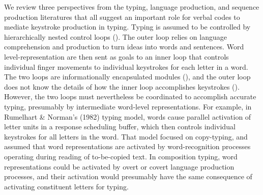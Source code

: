 \documentclass[floatsintext,man]{apa6}
\theoremstyle{definition}
\theoremstyle{definition}
\theoremstyle{definition}
\theoremstyle{remark}
\begin{document}
We review three perspectives from the typing, language production, and
sequence production literatures that all suggest an important role for
verbal codes to mediate keystroke production in typing. Typing is
assumed to be controlled by hierarchically nested control loops (). The
outer loop relies on language comprehension and production to turn ideas
into words and sentences. Word level-representation are then sent as
goals to an inner loop that controls individual finger movements to
individual keystrokes for each letter in a word. The two loops are
informationally encapsulated modules (), and the outer loop does not
know the details of how the inner loop accomplishes keystrokes ().
However, the two loops must nevertheless be coordinated to accomplish
accurate typing, presumably by intermediate word-level representations.
For example, in Rumelhart \& Norman's (1982) typing model, words cause
parallel activation of letter units in a response scheduling buffer,
which then controls individual keystrokes for all letters in the word.
That model focused on copy-typing, and assumed that word representations
are activated by word-recognition processes operating during reading of
to-be-copied text. In composition typing, word representations could be
activated by overt or covert language production processes, and their
activation would presumably have the same consequence of activating
constituent letters for typing.
\end{document}
